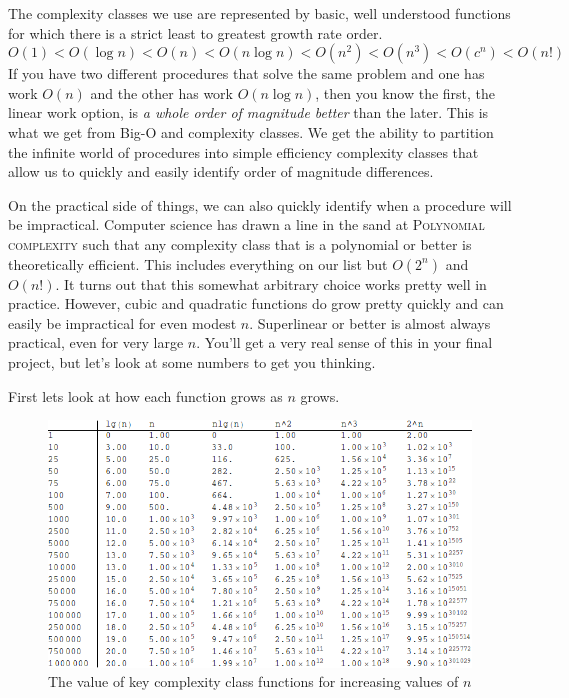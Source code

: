 \documentclass[]{tufte-handout}
\begin{document}
The complexity classes we use are represented by basic, well understood functions for which there is a strict least to greatest growth rate order.
\[
O(1) < O(\log n) < O(n) < O(n \log n) < O(n^2) < O(n^3) < O(c^n) < O(n!)
\]
If you have two different procedures that solve the same problem and one has work $O(n)$ and the other has work $O(n \log n)$, then you know the first, the linear work option, is \textit{a whole order of magnitude better} than the later. This is what we get from Big-O and complexity classes. We get the ability to partition the infinite world of procedures into simple efficiency complexity classes that allow us to quickly and easily identify order of magnitude differences.  

On the practical side of things, we can also quickly identify when a procedure will be impractical. Computer science has drawn a line in the sand at \textsc{Polynomial complexity} such that any complexity class that is a polynomial or better is theoretically efficient. This includes everything on our list but $O(2^n)$ and $O(n!)$. It turns out that this somewhat arbitrary choice works pretty well in practice. However, cubic and quadratic functions do grow pretty quickly and can easily be impractical for even modest $n$.  Superlinear or better is almost always practical, even for very large $n$.  You'll get a very real sense of this in your final project, but let's look at some numbers to get you thinking. 


First lets look at how each function grows as $n$ grows.
\begin{figure}
\includegraphics[scale=0.45]{nvals.png}
\caption{The value of key complexity class functions for increasing values of $n$}
\end{figure}
\end{document}
